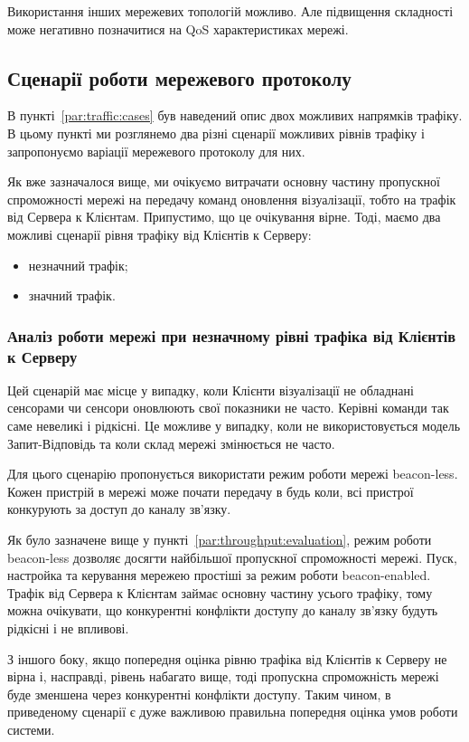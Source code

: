 \documentclass[a4paper,ukrainian,utf8,nocolumnsxix,floatsection,equationsection]{eskdtext}
\renewcommand\paragraph{\subsubsection}
\newcommand{\blm}[0]{beacon-less\xspace}
\newcommand{\bem}[0]{beacon-enabled\xspace}
\begin{document}
Використання інших мережевих топологій можливо. Але підвищення складності може негативно позначитися на QoS характеристиках мережі.

\subsection{Сценарії роботи мережевого протоколу}
\label{sub:network:protocol:scenarios}

В пункті~\ref{par:traffic:cases} був наведений опис двох можливих напрямків трафіку. В цьому пункті ми розглянемо два різні сценарії можливих рівнів трафіку і запропонуємо варіації мережевого протоколу для них.

Як вже зазначалося вище, ми очікуємо витрачати основну частину пропускної спроможності мережі на передачу команд оновлення візуалізації, тобто на трафік від Сервера к Клієнтам. Припустимо, що це очікування вірне. Тоді, маємо два можливі сценарії рівня трафіку від Клієнтів к Серверу:
\begin{itemize}
	\item незначний трафік;
	\item значний трафік.
\end{itemize}


\paragraph{Аналіз роботи мережі при незначному рівні трафіка від Клієнтів к Серверу}
\label{par:low:ntht}

Цей сценарій має місце у випадку, коли Клієнти візуалізації не обладнані сенсорами чи сенсори оновлюють свої показники не часто. Керівні команди так саме невеликі і рідкісні. Це можливе у випадку, коли не використовується модель Запит-Відповідь та коли склад мережі змінюється не часто.

Для цього сценарію пропонується використати режим роботи мережі \blm. Кожен пристрій в мережі може почати передачу в будь коли, всі пристрої конкурують за доступ до каналу зв’язку. 

Як було зазначене вище у пункті~\ref{par:throughput:evaluation}, режим роботи \blm дозволяє досягти найбільшої пропускної спроможності мережі. Пуск, настройка та керування мережею простіші за режим роботи \bem. Трафік від Сервера к Клієнтам займає основну частину усього трафіку, тому можна очікувати, що конкурентні конфлікти доступу до каналу зв’язку будуть рідкісні і не впливові.

З іншого боку, якщо попередня оцінка рівню трафіка від Клієнтів к Серверу не вірна і, насправді, рівень набагато вище, тоді пропускна спроможність мережі буде зменшена через конкурентні конфлікти доступу. Таким чином, в приведеному сценарії є дуже важливою правильна попередня оцінка умов роботи системи.
\end{document}
